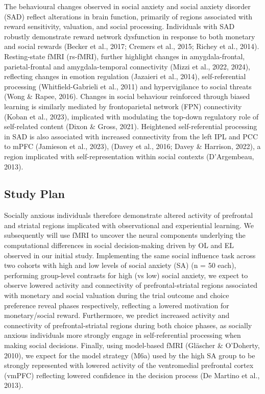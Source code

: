 \documentclass[12pt,a4paper,oneside,]{book} %
\begin{document}
The behavioural changes observed in social anxiety and social anxiety disorder (SAD) reflect alterations in brain function, primarily of regions associated with reward sensitivity, valuation, and social processing. Individuals with SAD robustly demonstrate reward network dysfunction in response to both monetary and social rewards (Becker et al., 2017; Cremers et al., 2015; Richey et al., 2014). Resting-state fMRI (rs-fMRI), further highlight changes in amygdala-frontal, parietal-frontal and amygdala-temporal connectivity (Mizzi et al., 2022, 2024), reflecting changes in emotion regulation (Jazaieri et al., 2014), self-referential processing (Whitfield-Gabrieli et al., 2011) and hypervigilance to social threats (Wong \& Rapee, 2016). Changes in social behaviour reinforced through biased learning is similarly mediated by frontoparietal network (FPN) connectivity (Koban et al., 2023), implicated with modulating the top-down regulatory role of self-related content (Dixon \& Gross, 2021). Heightened self-referential processing in SAD is also associated with increased connectivity from the left IPL and PCC to mPFC (Jamieson et al., 2023), (Davey et al., 2016; Davey \& Harrison, 2022), a region implicated with self-representation within social contexts (D'Argembeau, 2013).

\subsection{Study Plan}\label{study-plan}

Socially anxious individuals therefore demonstrate altered activity of prefrontal and striatal regions implicated with observational and experiential learning. We subsequently will use fMRI to uncover the neural components underlying the computational differences in social decision-making driven by OL and EL observed in our initial study. Implementing the same social influence task across two cohorts with high and low levels of social anxiety (SA) (n = 50 each), performing group-level contrasts for high (vs low) social anxiety, we expect to observe lowered activity and connectivity of prefrontal-striatal regions associated with monetary and social valuation during the trial outcome and choice preference reveal phases respectively, reflecting a lowered motivation for monetary/social reward. Furthermore, we predict increased activity and connectivity of prefrontal-striatal regions during both choice phases, as socially anxious individuals more strongly engage in self-referential processing when making social decisions. Finally, using model-based fMRI (Gläscher \& O'Doherty, 2010), we expect for the model strategy (M6a) used by the high SA group to be strongly represented with lowered activity of the ventromedial prefrontal cortex (vmPFC) reflecting lowered confidence in the decision process (De Martino et al., 2013).
\end{document}
